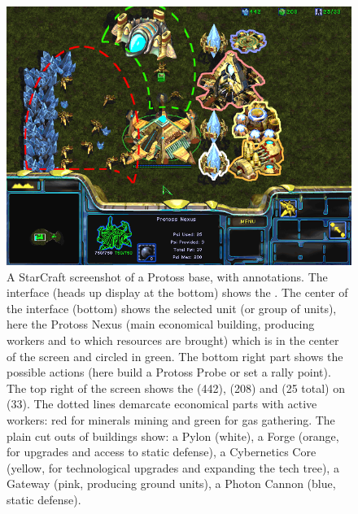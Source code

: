 \begin{figure}[!ht]
\begin{center}
\includegraphics[width=0.9\columnwidth]{images/SC_eco.png}
\caption{A StarCraft screenshot of a Protoss base, with annotations. The interface (heads up display at the bottom) shows the \textit{}. The center of the interface (bottom) shows the selected unit (or group of units), here the Protoss Nexus (main economical building, producing workers and to which resources are brought) which is in the center of the screen and circled in green. The bottom right part shows the possible actions (here build a Protoss Probe or set a rally point). The top right of the screen shows the  (442),  (208) and  (25 total) on  (33). The dotted lines demarcate economical parts with active workers: red for minerals mining and green for gas gathering. The plain cut outs of buildings show: a Pylon (white), a Forge (orange, for upgrades and access to static defense), a Cybernetics Core (yellow, for technological upgrades and expanding the tech tree), a Gateway (pink, producing ground units), a Photon Cannon (blue, static defense).}
\label{fig:SC_eco}
\end{center}
\end{figure}

